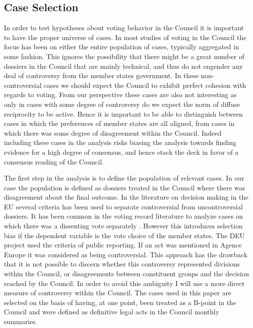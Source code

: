 \subsection{Case Selection}

In order to test hypotheses about voting behavior in the Council it is important to have the proper universe of cases. In most studies of voting in the Council the focus has been on either the entire population of cases, typically aggregated in some fashion. This ignores the possibility that there might be a great number of dossiers in the Council that are mainly technical, and thus do not engender any deal of controversy from the member states government. In these non-controversial cases we should expect the Council to exhibit perfect cohesion with regards to voting. From our perspective these cases are also not interesting as only in cases with some degree of controversy do we expect the norm of diffuse reciprocity to be active. Hence it is important to be able to distinguish between cases in which the preferences of member states are all aligned, from cases in which there was some degree of disagreement within the Council. Indeed including these cases in the analysis risks biasing the analysis towards finding evidence for a high degree of consensus, and hence stack the deck in favor of a consensus reading of the Council. 

The first step in the analysis is to define the population of relevant cases. In our case the population is defined as dossiers treated in the Council where there was disagreement about the final outcome. In the literature on decision making in the EU several criteria has been used to separate controversial from uncontroversial dossiers. It has been common in the voting record literature to analyze cases on which there was a dissenting vote separately \citep{Heisenberg2005,Hayes-renshaw2006,Hagemann2008}. However this introduces selection bias if the dependent variable is the vote choice of the member states. The DEU project \citep{Thomson2006a} used the criteria of public reporting. If an act was mentioned in Agence Europe it was considered as being controversial. This approach has the drawback that it is not possible to discern whether this controversy represented divisions within the Council, or disagreements between constituent groups and the decision reached by the Council. In order to avoid this ambiguity I will use a more direct measure of controversy within the Council. The cases used in this paper are selected on the basis of having, at one point, been treated as a B-point in the Council and were defined as definitive legal acts in the Council monthly summaries.

